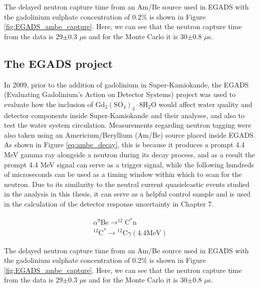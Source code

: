 The delayed neutron capture time from an Am/Be source used in EGADS with the gadolinium sulphate concentration of 0.2\% is shown in Figure \ref{fig:EGADS_ambe_capture}. Here, we can see that the neutron capture time from the data is 29$\pm$0.3 $\mu$s and for the Monte Carlo it is 30$\pm$0.8 $\mu$s.

\subsection{The EGADS project}

In 2009, prior to the addition of gadolinium in Super-Kamiokande, the EGADS (Evaluating Gadolinium's Action on Detector Systems) project was used to evaluate how the inclusion of $\mathrm{Gd}_{2}\left(\mathrm{SO}_{4}\right)_{3} \cdot 8 \mathrm{H}_{2} \mathrm{O}$ would affect water quality and detector components inside Super-Kamiokande and their analyses, and also to test the water system circulation. Measurements regarding neutron tagging were also taken using an Americium/Beryllium (Am/Be) source placed inside EGADS. As shown in Figure \ref{eq:ambe_decay}, this is because it produces a prompt 4.4 MeV gamma ray alongside a neutron during its decay process, and as a result the prompt 4.4 MeV signal can serve as a trigger signal, while the following hundreds of microseconds can be used as a timing window within which to scan for the neutron. Due to its similarity to the neutral current quasieleastic events studied in the analysis in this thesis, it can serve as a helpful control sample and is used in the calculation of the detector response uncertainty in Chapter 7. 

\begin{equation}
\begin{array}{c}
\alpha^{9} \mathrm{Be} \longrightarrow^{12} \mathrm{C}^{*} \mathrm{n} \\
{ }^{12} \mathrm{C}^{*} \longrightarrow{ }^{12} \mathrm{C} \gamma(4.4 \mathrm{MeV})
\end{array}
\label{eq:ambe_decay}
\end{equation}

The delayed neutron capture time from an Am/Be source used in EGADS with the gadolinium sulphate concentration of 0.2\% is shown in Figure \ref{fig:EGADS_ambe_capture}. Here, we can see that the neutron capture time from the data is 29$\pm$0.3 $\mu$s and for the Monte Carlo it is 30$\pm$0.8 $\mu$s.

